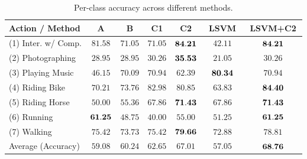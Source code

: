 \documentclass{bmvc2k}
\newcommand{\parnspc}{\vspace*{-4.2mm}}     %
\newcommand{\tablespc}{\vspace{-4mm}}
\newcommand{\tfs}{\small}   %
\newcommand{\cfs}{\small}   %
\begin{document}
\begin{small}
\begin{table}[tbp]
\centering
{}
\begin{tabular}{|l|c|c|c|c||c||c|}
\hline
\tfs Action /  Method & \tfs$~~$A$~~$ & \tfs$~~$B$~~$ & \tfs$~~$C1$~~$ & \tfs$~~$C2$~~$ & \tfs$~~$LSVM$~~$ & \tfs$~$LSVM+C2$~$ \\ \hline 
\tfs(1) Inter. w/ Comp. & \tfs$81.58$ & \tfs$71.05$ & \tfs$71.05$ & \tfs${\bf 84.21}$ & \tfs$42.11$ & \tfs${\bf 84.21}$\\ \hline 
\tfs(2) Photographing   & \tfs$28.95$ & \tfs$28.95$ & \tfs$30.26$ & \tfs${\bf 35.53}$ & \tfs$21.05$ & \tfs$30.26$\\ \hline 
\tfs(3) Playing Music   & \tfs$46.15$ & \tfs$70.09$ & \tfs$70.94$ & \tfs$62.39$ & \tfs${\bf 80.34}$ & \tfs$70.94$\\ \hline 
\tfs(4) Riding Bike     & \tfs$70.21$ & \tfs$73.76$ & \tfs$82.98$ & \tfs$80.85$ & \tfs$63.83$ & \tfs${\bf 84.40}$\\ \hline 
\tfs(5) Riding Horse    & \tfs$50.00$ & \tfs$55.36$ & \tfs$67.86$ & \tfs${\bf 71.43}$ & \tfs$67.86$ & \tfs${\bf 71.43}$\\ \hline 
\tfs(6) Running         & \tfs${\bf 61.25}$ & \tfs$48.75$ & \tfs$40.00$ & \tfs$55.00$ & \tfs$51.25$ & \tfs${\bf 61.25}$\\ \hline 
\tfs(7) Walking         & \tfs$75.42$ & \tfs$73.73$ & \tfs$75.42$ & \tfs${\bf 79.66}$ & \tfs$72.88$ & \tfs$78.81$\\ \hline  \hline
\tfs Average (Accuracy) & \tfs$59.08$ & \tfs$60.24$ & \tfs$62.65$ & \tfs$67.01$ & \tfs$57.05$ & \tfs${\bf 68.76}$\\ \hline 
\end{tabular}
\vspace{2mm}
\caption{\cfs Per-class accuracy across different methods. \normalsize}
\label{tab:per_class}
\tablespc
\end{table}
\end{small}

\parnspc
\end{document}

